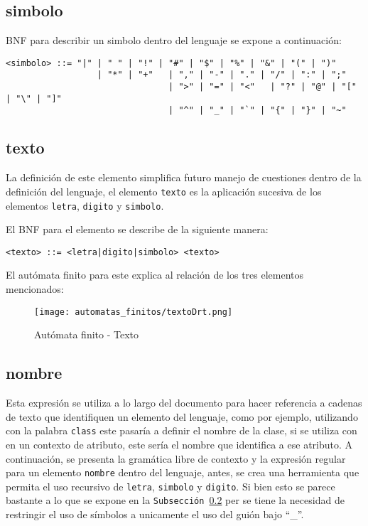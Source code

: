 \subsection{simbolo}
\label{sub:simbolo}
BNF para describir un simbolo dentro del lenguaje se expone a continuación:

\begin{lstlisting}[basicstyle=\footnotesize\ttfamily]
	<simbolo> ::= "|" | " " | "!" | "#" | "$" | "%" | "&" | "(" | ")"
	              | "*" | "+"	| "," | "-" | "." | "/" | ":" | ";"
								| ">" | "=" | "<"	| "?" | "@" | "[" | "\"	| "]"
								| "^" | "_" | "`" | "{" | "}" | "~"
\end{lstlisting}

\subsection{texto}
\label{sub:texto}
La definición de este elemento simplifica futuro manejo de cuestiones dentro de
la definición del lenguaje, el elemento \texttt{texto} es la aplicación
sucesiva de los elementos \texttt{letra}, \texttt{digito} y \texttt{simbolo}.

El BNF para el elemento se describe de la siguiente manera:

\begin{lstlisting}[basicstyle=\footnotesize\ttfamily]
  <texto> ::= <letra|digito|simbolo> <texto>
\end{lstlisting}

El autómata finito para este explica al relación de los tres elementos
mencionados:

\begin{figure}[H]
	\centering
	\texttt{[image: automatas\_finitos/textoDrt.png]}
	\caption{Autómata finito - Texto}
	\label{fig:texto}
\end{figure}

\subsection{nombre}
\label{sub:nombre}
Esta expresión se utiliza a lo largo del documento para hacer referencia a
cadenas de texto que identifiquen un elemento del lenguaje, como por ejemplo,
utilizando con la palabra \texttt{class} este pasaría a definir el nombre de la
clase, si se utiliza con en un contexto de atributo, este sería
el nombre que identifica a ese atributo. A continuación, se presenta la
gramática libre de contexto y la expresión regular para un elemento
\texttt{nombre} dentro del lenguaje, antes, se crea una herramienta que permita el uso
recursivo de \texttt{letra}, \texttt{simbolo} y \texttt{digito}.
Si bien esto se parece bastante a lo que se expone en la \texttt{Subsección
\ref{sub:texto}} per se tiene la necesidad de restringir el uso de símbolos
a unicamente el uso del guión bajo ``\_''.


